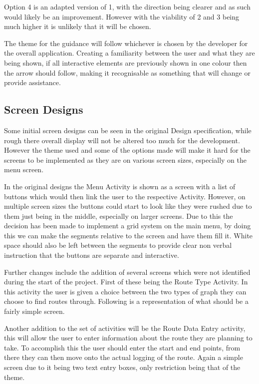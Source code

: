 Option 4 is an adapted version of 1, with the direction being clearer and as such would likely be an improvement. However with the viability of 2 and 3 being much higher it is unlikely that it will be chosen.

The theme for the guidance will follow whichever is chosen by the developer for the overall application. Creating a familiarity between the user and what they are being shown, if all interactive elements are previously shown in one colour then the arrow should follow, making it recognisable as something that will change or provide assistance. 
\subsection{Screen Designs}
Some initial screen designs can be seen in the original Design specification, while rough there overall display will not be altered too much for the development. However the theme used and some of the options made will make it hard for the screens to be implemented as they are on various screen sizes, especially on the menu screen.

In the original designs the Menu Activity is shown as a screen with a list of buttons which would then link the user to the respective Activity. However, on multiple screen sizes the buttons could start to look like they were rushed due to them just being in the middle, especially on larger screens. Due to this the decision has been made to implement a grid system on the main menu, by doing this we can make the segments relative to the screen and have them fill it. White space should also be left between the segments to provide clear non verbal instruction that the buttons are separate and interactive. 

Further changes include the addition of several screens which were not identified during the start of the project. First of these being the Route Type Activity. In this activity the user is given a choice between the two types of graph they can choose to find routes through. Following is a representation of what should be a fairly simple screen.

Another addition to the set of activities will be the Route Data Entry activity, this will allow the user to enter information about the route they are planning to take. To accomplish this the user should enter the start and end points, from there they can then move onto the actual logging of the route. Again a simple screen due to it being two text entry boxes, only restriction being that of the theme.
\newpage